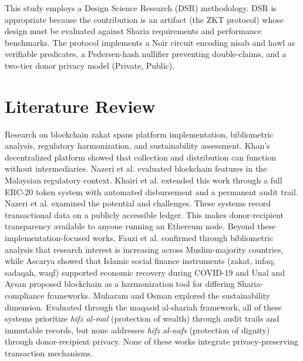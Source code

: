 \documentclass[conference]{IEEEtran}
\begin{document}
This study employs a Design Science Research (DSR) methodology. DSR is appropriate because the contribution is an artifact (the ZKT protocol) whose design must be evaluated against Sharia requirements and performance benchmarks\cite{b_maqasid_data}\cite{b_zkp_financial}. The protocol implements a Noir circuit encoding nisab and hawl as verifiable predicates\cite{b_noir}, a Pedersen-hash nullifier preventing double-claims\cite{b_aztec}\cite{b_poseidon}, and a two-tier donor privacy model (Private, Public)\cite{b_zkfi}\cite{b_zkp_idm}.

\section{Literature Review}

Research on blockchain zakat spans platform implementation, bibliometric analysis, regulatory harmonization, and sustainability assessment\cite{b_zakat_biblio}\cite{b_isf_blockchain}. Khan's decentralized platform\cite{b_zakat_acm} showed that collection and distribution can function without intermediaries. Nazeri et al.\cite{b_zakat_malaysia} evaluated blockchain features in the Malaysian regulatory context. Khairi et al.\cite{b_zakat_transparency} extended this work through a full ERC-20 token system with automated disbursement and a permanent audit trail\cite{b_zakat_transparency}. Nazeri et al.\cite{b_zakat_emerald} examined the potential and challenges. These systems record transactional data on a publicly accessible ledger\cite{b_zakat_acm}\cite{b_zakat_malaysia}\cite{b_zakat_transparency}. This makes donor-recipient transparency available to anyone running an Ethereum node\cite{b_zkp_cacm}\cite{b_ziswaf_blockchain}. Beyond these implementation-focused works, Fauzi et al.\cite{b_zakat_biblio} confirmed through bibliometric analysis that research interest is increasing across Muslim-majority countries, while Ascarya\cite{b_isf_covid} showed that Islamic social finance instruments (zakat, infaq, sadaqah, waqf) supported economic recovery during COVID-19 and Unal and Aysan\cite{b_ziswaf_blockchain} proposed blockchain as a harmonization tool for differing Sharia-compliance frameworks. Muharam and Osman\cite{b_isf_blockchain} explored the sustainability dimension. Evaluated through the maqasid al-shariah framework\cite{b_maqasid_data}\cite{b_maqasid_fintech}, all of these systems prioritize \textit{hifz al-mal} (protection of wealth) through audit trails and immutable records, but none addresses \textit{hifz al-nafs} (protection of dignity) through donor-recipient privacy\cite{b_maqasid_privacy}\cite{b_maqasid_blockchain}. None of these works integrate privacy-preserving transaction mechanisms\cite{b_zkp_circuits}\cite{b_zkp_financial}.
\end{document}

